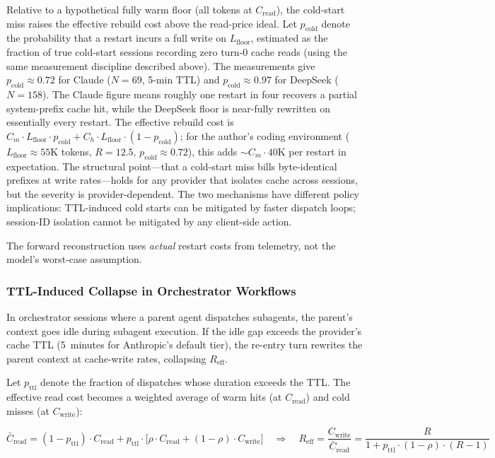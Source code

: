 \documentclass[11pt]{article}
\theoremstyle{definition}
\theoremstyle{remark}
\begin{document}
Relative to a hypothetical fully warm floor (all tokens at $C_{\text{read}}$), the cold-start miss raises the effective rebuild cost above the read-price ideal. Let $p_{\text{cold}}$ denote the probability that a restart incurs a full write on $L_{\text{floor}}$, estimated as the fraction of true cold-start sessions recording zero turn-0 cache reads (using the same measurement discipline described above). The measurements give $p_{\text{cold}} \approx 0.72$ for Claude ($N = 69$, 5-min TTL) and $p_{\text{cold}} \approx 0.97$ for DeepSeek ($N = 158$). The Claude figure means roughly one restart in four recovers a partial system-prefix cache hit, while the DeepSeek floor is near-fully rewritten on essentially every restart. The effective rebuild cost is $C_m \cdot L_{\text{floor}} \cdot p_{\text{cold}} + C_h \cdot L_{\text{floor}} \cdot (1-p_{\text{cold}})$; for the author's coding environment ($L_{\text{floor}} \approx 55$K tokens, $R = 12.5$, $p_{\text{cold}} \approx 0.72$), this adds $\sim$$C_m \cdot 40\text{K}$ per restart in expectation. The structural point---that a cold-start miss bills byte-identical prefixes at write rates---holds for any provider that isolates cache across sessions, but the severity is provider-dependent. The two mechanisms have different policy implications: TTL-induced cold starts can be mitigated by faster dispatch loops; session-ID isolation cannot be mitigated by any client-side action.

The forward reconstruction uses \emph{actual} restart costs from telemetry, not the model's worst-case assumption.

\subsubsection{TTL-Induced Collapse in Orchestrator Workflows}
\label{sec:ttl}

In orchestrator sessions where a parent agent dispatches subagents, the parent's context goes idle during subagent execution. If the idle gap exceeds the provider's cache TTL (5~minutes for Anthropic's default tier), the re-entry turn rewrites the parent context at cache-write rates, collapsing $R_{\text{eff}}$.

Let $p_{\text{ttl}}$ denote the fraction of dispatches whose duration exceeds the TTL. The effective read cost becomes a weighted average of warm hits (at $C_{\text{read}}$) and cold misses (at $C_{\text{write}}$):

\begin{equation}
\bar{C}_{\text{read}} = (1-p_{\text{ttl}}) \cdot C_{\text{read}} + p_{\text{ttl}} \cdot \bigl[\rho \cdot C_{\text{read}} + (1-\rho) \cdot C_{\text{write}}\bigr]
\quad\Longrightarrow\quad
R_{\text{eff}} = \frac{C_{\text{write}}}{\bar{C}_{\text{read}}} = \frac{R}{1 + p_{\text{ttl}} \cdot (1-\rho) \cdot (R-1)}
\label{eq:reff}
\end{equation}
\end{document}
